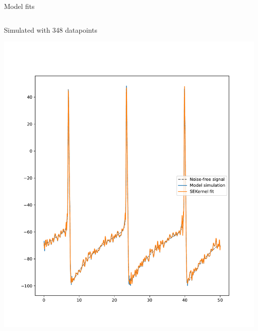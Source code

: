 \documentclass[presentation]{beamer}
\begin{document}
\begin{frame}[plain,label={sec:org23978bc}]{Model fits}
\begin{columns}
\begin{column}{0.5\columnwidth}
\begin{center}
Simulated with 348 datapoints
\end{center}
\begin{center}
\includegraphics[width=1.1\textwidth]{./nodownsample.pdf}
\end{center}
\end{column}
\end{columns}
\end{frame}
\end{document}
